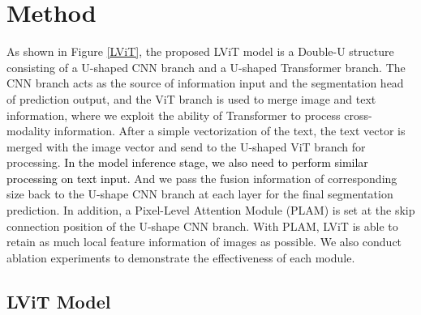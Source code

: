 \documentclass[lettersize,journal]{IEEEtran}
\begin{document}
\section{Method}
\label{others}
As shown in Figure \ref{LViT}, the proposed LViT model is a Double-U structure consisting of a U-shaped CNN branch and a U-shaped Transformer branch.
The CNN branch acts as the source of information input and the segmentation head of prediction output, and the ViT branch is used to merge image and text information, where we exploit the ability of Transformer to process cross-modality information. After a simple vectorization of the text, the text vector is merged with the image vector and send to the U-shaped ViT branch for processing. \textcolor{black}{In the model inference stage, we also need to perform similar processing on text input.} And we pass the fusion information of corresponding size back to the U-shape CNN branch at each layer for the final segmentation prediction. In addition, a Pixel-Level Attention Module (PLAM) is set at the skip connection position of the U-shape CNN branch. With PLAM, LViT is able to retain as much local feature information of images as possible. We also conduct ablation experiments to demonstrate the effectiveness of each module.

\subsection{LViT Model}
\end{document}
